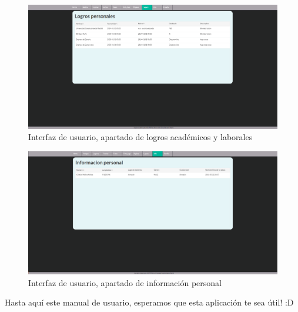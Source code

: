 \begin{figure}
	\begin{center}
		\includegraphics[scale=0.3]{Imagenes/Fuentes/InterfazLogros.png} \caption{Interfaz de usuario, apartado de logros académicos y laborales}
		\label{WebAplication9}
	\end{center}
\end{figure}
\begin{figure}
	\begin{center}
		\includegraphics[scale=0.3]{Imagenes/Fuentes/InterfazInfo.png} \caption{Interfaz de usuario, apartado de información personal}
		\label{WebAplication10}
	\end{center}
\end{figure}

Hasta aquí este manual de usuario, esperamos que esta aplicación te sea útil! :D \newpage
